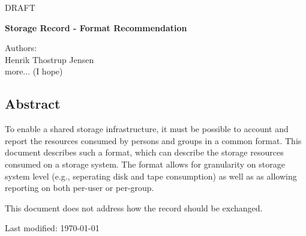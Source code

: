 
\huge{DRAFT}

\vspace{1cm}

{\Large \bf Storage Record - Format Recommendation}

\vspace{1.5cm}

\large{Authors:\\
Henrik Thostrup Jensen\\
more... (I hope)
}

\vspace{0.5cm}

\subsection*{Abstract}

To enable a shared storage infrastructure, it must be possible to account and
report the resources consumed by persons and groups in a common format. This
document describes such a format, which can describe the storage resources
consumed on a storage system. The format allows for granularity on storage
system level (e.g., seperating disk and tape consumption) as well as as
allowing reporting on both per-user or per-group.

\vspace{.5cm}

\noindent
This document does not address how the record should be exchanged.


\vspace{2cm}

Last modified: \today

